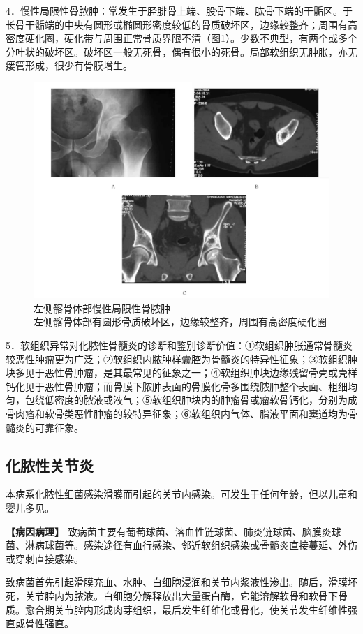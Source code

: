 4．慢性局限性骨脓肿：常发生于胫腓骨上端、股骨下端、肱骨下端的干骺区。于长骨干骺端的中央有圆形或椭圆形密度较低的骨质破坏区，边缘较整齐；周围有高密度硬化圈，硬化带与周围正常骨质界限不清（图\ref{fig22-12}）。少数不典型，有两个或多个分叶状的破坏区。破坏区一般无死骨，偶有很小的死骨。局部软组织无肿胀，亦无瘘管形成，很少有骨膜增生。

\begin{figure}[!htbp]
 \centering
 \includegraphics[width=.7\textwidth,height=\textheight,keepaspectratio]{./images/Image00428.jpg}
 \captionsetup{justification=centering}
 \caption{左侧髂骨体部慢性局限性骨脓肿\\{\small 左侧髂骨体部有圆形骨质破坏区，边缘较整齐，周围有高密度硬化圈}}
 \label{fig22-12}
  \end{figure} 

5．软组织异常对化脓性骨髓炎的诊断和鉴别诊断价值：①软组织肿胀通常骨髓炎较恶性肿瘤更为广泛；②软组织内脓肿样囊腔为骨髓炎的特异性征象；③软组织肿块多见于恶性骨肿瘤，是其最常见的征象之一；④软组织肿块边缘残留骨壳或壳样钙化见于恶性骨肿瘤；而骨膜下脓肿表面的骨膜化骨多围绕脓肿整个表面、粗细均匀，包绕低密度的脓液或液气；⑤软组织肿块内的肿瘤骨或瘤软骨钙化，分别为成骨肉瘤和软骨类恶性肿瘤的较特异征象；⑥软组织内气体、脂液平面和窦道均为骨髓炎的可靠征象。

\subsection{化脓性关节炎}

本病系化脓性细菌感染滑膜而引起的关节内感染。可发生于任何年龄，但以儿童和婴儿多见。

\textbf{【病因病理】}
致病菌主要有葡萄球菌、溶血性链球菌、肺炎链球菌、脑膜炎球菌、淋病球菌等。感染途径有血行感染、邻近软组织感染或骨髓炎直接蔓延、外伤或穿刺直接感染。

致病菌首先引起滑膜充血、水肿、白细胞浸润和关节内浆液性渗出。随后，滑膜坏死，关节腔内为脓液。白细胞分解释放出大量蛋白酶，它能溶解软骨和软骨下骨质。愈合期关节腔内形成肉芽组织，最后发生纤维化或骨化，使关节发生纤维性强直或骨性强直。

